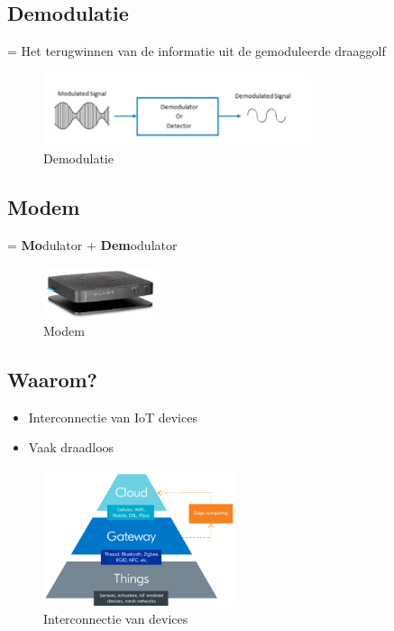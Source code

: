 \documentclass{article}
\newcommand{\bold}[1]{\textbf{#1}}
\begin{document}
\subsection{Demodulatie}
= Het terugwinnen van de informatie uit de gemoduleerde draaggolf

\begin{figure}[H]
    \centering
    \includegraphics[width=0.7\textwidth]{Screenshot_20200302_115359.png}
    \caption{Demodulatie}
\end{figure}

\subsection{Modem}
= \bold{Mo}dulator + \bold{Dem}odulator

\begin{figure}[H]
    \centering
    \includegraphics[width=0.3\textwidth]{Screenshot_20200302_115504.png}
    \caption{Modem}
\end{figure}

\subsection{Waarom?}

\begin{itemize}
    \item Interconnectie van IoT devices
    \item Vaak draadloos
\end{itemize}

\begin{figure}[H]
    \centering
    \includegraphics[width=0.5\textwidth]{Screenshot_20200302_115646.png}
    \caption{Interconnectie van devices}
\end{figure}
\end{document}
